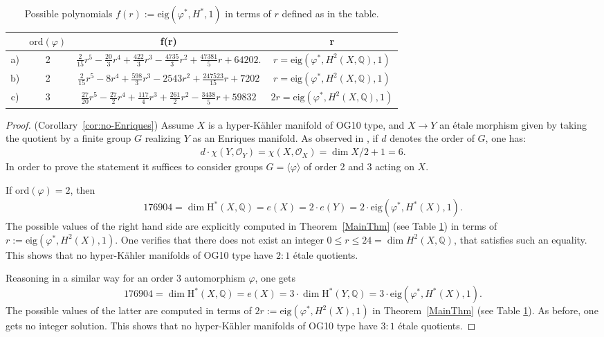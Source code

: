 \documentclass[a4paper,11pt]{amsart}
\newcommand{\Q}{{\mathbb Q}}
\newcommand{\eig}{{\mathrm{eig}}}
\newcommand{\bbQ}{{\mathbb Q}}
\newcommand{\mH}{{\mathrm H}}
\newcommand{\ord}{{\mathrm{ord}}}
\theoremstyle{plain}
\theoremstyle{remark}
\begin{document}
\begin{table}[] \caption{Possible polynomials \(f(r):=\eig(\varphi^*,H^*,1)\) in terms of $r$ defined as in the table.}
    \centering
    \begin{tabular}{ |c|c|c|c| }
 \hline
  & \(\ord(\varphi)\) & f(r)& r\\
  \hline
 a) & 2&\( \frac{2}{15}r^5 - \frac{20}{3}r^4 + \frac{422}{3}r^3 - \frac{4735}{3}r^2 + \frac{47381}{5}r + 64202.\)&\(r=\eig(\varphi^*,H^2(X,\bbQ),1)\)\\
 
 b) & 2&\(\frac{2}{15}r^5 - 8r^4 + \frac{598}{3}r^3 -2543r^2 + \frac{247523}{15}r + 7202 \)&\(r=\eig(\varphi^*,H^2(X,\bbQ),1)\)\\
 
 c) & 3& \( \frac{27}{20}r^5 - \frac{27}{2}r^4 + \frac{117}{4}r^3 + \frac{261}{2}r^2 - \frac{3438}{5}r + 59832\) &\(2r=\eig(\varphi^*,H^2(X,\bbQ),1)\)\\
 \hline
 \end{tabular}
    \label{table_pols}
\end{table}




\begin{proof}(Corollary~\ref{cor:no-Enriques})
Assume $X$ is a hyper-Kähler manifold of OG10 type, and $X\to Y$ an \'etale morphism given by taking the quotient by a finite group $G$ realizing $Y$ as an Enriques manifold.
    As observed in \cite{BN-WS}, if $d$ denotes the order of $G$, one has:
    \begin{align*}
        d \cdot \chi(Y,\mathcal O_Y) = \chi(X,\mathcal O_X) = \dim X/2 + 1 = 6.
    \end{align*}
    In order to prove the statement it suffices to consider groups $G=\langle \varphi\rangle$ of order 2 and 3 acting on $X$.
    
    If $\ord(\varphi)=2$, then 
    \begin{align*}
    176904 = \dim \mH^*(X,\bbQ) = e(X) = 2\cdot e(Y) = 2 \cdot \eig(\varphi^*, H^*(X), 1).
    \end{align*}
    The possible values of the right hand side are explicitly computed in Theorem~\ref{MainThm} (see Table \ref{table_pols}) in terms of $r:=\eig(\varphi^*, H^2(X), 1)$. One verifies that there does not exist an integer $0\leq r\leq 24=\dim H^2(X,\Q)$, that satisfies such an equality. This shows that no hyper-Kähler manifolds of OG10 type have \(2:1\) \'etale quotients.

    
 Reasoning in a similar way for an order $3$ automorphism $\varphi$, one gets 
 \[ 
 176904 = \dim \mH^*(X,\bbQ) = e(X) = 3 \cdot \dim \mH^*(Y, \mathbb Q) = 3 \cdot \eig(\varphi^*, H^*(X), 1).
 \]
The possible values of the latter are computed in terms of \(2r:=\eig(\varphi^*, H^2(X), 1)\) in Theorem~\ref{MainThm} (see Table \ref{table_pols}).
 As before, one gets no integer solution. This shows that no hyper-Kähler manifolds of OG10 type have \(3:1\) \'etale quotients.
\end{proof}
\end{document}
